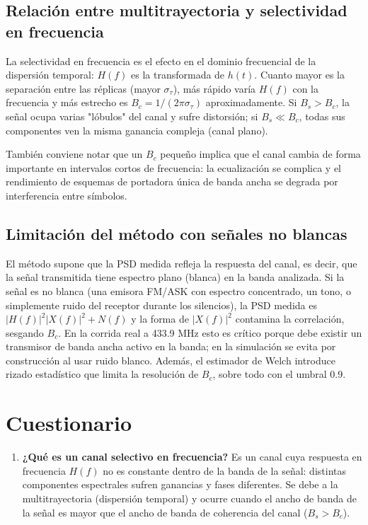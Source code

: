 \documentclass[11pt,a4paper]{article}
\begin{document}
\subsection{Relación entre multitrayectoria y selectividad en frecuencia}

La selectividad en frecuencia es el efecto en el dominio frecuencial de la dispersión temporal: $H(f)$ es la transformada de $h(t)$. Cuanto mayor es la separación entre las réplicas (mayor $\sigma_\tau$), más rápido varía $H(f)$ con la frecuencia y más estrecho es $B_c=1/(2\pi\sigma_\tau)$ aproximadamente. Si $B_s>B_c$, la señal ocupa varias "lóbulos" del canal y sufre distorsión; si $B_s\ll B_c$, todas sus componentes ven la misma ganancia compleja (canal plano).

También conviene notar que un $B_c$ pequeño implica que el canal cambia de forma importante en intervalos cortos de frecuencia: la ecualización se complica y el rendimiento de esquemas de portadora única de banda ancha se degrada por interferencia entre símbolos.

\subsection{Limitación del método con señales no blancas}

El método supone que la PSD medida refleja la respuesta del canal, es decir, que la señal transmitida tiene espectro plano (blanca) en la banda analizada. Si la señal es no blanca (una emisora FM/ASK con espectro concentrado, un tono, o simplemente ruido del receptor durante los silencios), la PSD medida es $|H(f)|^2|X(f)|^2+N(f)$ y la forma de $|X(f)|^2$ contamina la correlación, sesgando $B_c$. En la corrida real a 433.9 MHz esto es crítico porque debe existir un transmisor de banda ancha activo en la banda; en la simulación se evita por construcción al usar ruido blanco. Además, el estimador de Welch introduce rizado estadístico que limita la resolución de $B_c$, sobre todo con el umbral 0.9.

\section{Cuestionario}

\begin{enumerate}
  \item \textbf{¿Qué es un canal selectivo en frecuencia?} Es un canal cuya respuesta en frecuencia $H(f)$ no es constante dentro de la banda de la señal: distintas componentes espectrales sufren ganancias y fases diferentes. Se debe a la multitrayectoria (dispersión temporal) y ocurre cuando el ancho de banda de la señal es mayor que el ancho de banda de coherencia del canal ($B_s>B_c$).
\end{enumerate}
\end{document}
